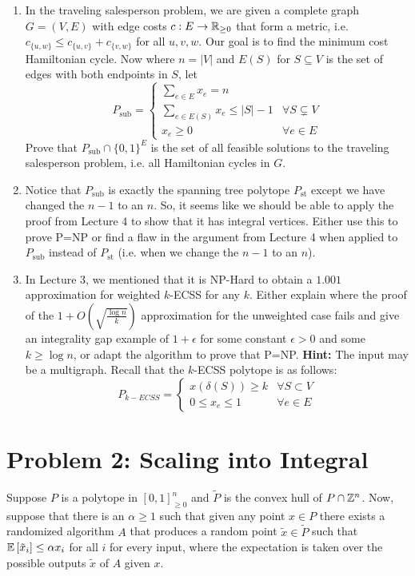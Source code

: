 \begin{enumerate}
	\item In the traveling salesperson problem, we are given a complete graph $G=(V,E)$ with edge costs $c: E \to \mathbb R_{\ge 0}$ that form a metric, i.e. $c_{\{u,w\}} \le c_{\{u,v\}}+c_{\{v,w\}}$ for all $u,v,w$. Our goal is to find the minimum cost Hamiltonian cycle. Now where $n=|V|$ and $E(S)$ for $S \subseteq V$ is the set of edges with both endpoints in $S$, let $$P_{\mathrm{sub}} = \begin{cases} \sum_{e \in E} x_e = n \\ \sum_{e \in E(S)} x_e \le |S|-1 & \forall S \subsetneq V \\ x_e \ge 0 & \forall e \in E \end{cases}$$
	Prove that $P_{\mathrm{sub}} \cap \{0,1\}^E$ is the set of all feasible solutions to the traveling salesperson problem, i.e. all Hamiltonian cycles in $G$. 
	\item Notice that $P_{\mathrm{sub}}$ is exactly the spanning tree polytope $P_{\mathrm{st}}$ except we have changed the $n-1$ to an $n$. So, it seems like we should be able to apply the proof from Lecture 4 to show that it has integral vertices. Either use this to prove P=NP or find a flaw in the argument from Lecture 4 when applied to $P_{\mathrm{sub}}$ instead of $P_{\mathrm{st}}$ (i.e. when we change the $n-1$ to an $n$).
	\item In Lecture 3, we mentioned that it is NP-Hard to obtain a $1.001$ approximation for weighted $k$-ECSS for any $k$. Either explain where the proof of the $1+O(\sqrt{\frac{\log n}{k}})$ approximation for the unweighted case fails and give an integrality gap example of $1+\epsilon$ for some constant $\epsilon > 0$ and some $k \ge \log n$, or adapt the algorithm to prove that P=NP. \textbf{Hint:} The input may be a multigraph. Recall that the $k$-ECSS polytope is as follows:
	 $$P_{k-ECSS} = \begin{cases} x(\delta(S)) \ge k & \forall S \subset V \\ 0 \le x_e \le 1 & \forall e \in E
 \end{cases}$$

\end{enumerate}

\section{Problem 2: Scaling into Integral}

Suppose $P$ is a polytope in $[0,1]_{\ge 0}^n$ and $\tilde{P}$ is the convex hull of $P \cap \mathbb Z^n$. Now, suppose that there is an $\alpha \ge 1$ such that given any point $x \in P$ there exists a randomized algorithm $A$ that produces a random point $\tilde{x} \in \tilde{P}$ such that ${\mathbb{E}}\left[\tilde{x}_i\right] \le \alpha x_i$ for all $i$ for every input, where the expectation is taken over the possible outputs $\tilde{x}$ of $A$ given $x$. 

